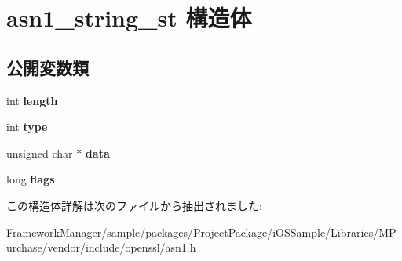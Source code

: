 \hypertarget{structasn1__string__st}{}\section{asn1\+\_\+string\+\_\+st 構造体}
\label{structasn1__string__st}
\subsection*{公開変数類}
\begin{DoxyCompactItemize}
\item 
\hypertarget{structasn1__string__st_a425b332bd4925320832bb18c59f6a9df}{}int {\bfseries length}\label{structasn1__string__st_a425b332bd4925320832bb18c59f6a9df}

\item 
\hypertarget{structasn1__string__st_a4bc5c5a5d5cd42ec6108e8bef50e09ad}{}int {\bfseries type}\label{structasn1__string__st_a4bc5c5a5d5cd42ec6108e8bef50e09ad}

\item 
\hypertarget{structasn1__string__st_a275a9784693f470debfb2b97411a4fea}{}unsigned char $\ast$ {\bfseries data}\label{structasn1__string__st_a275a9784693f470debfb2b97411a4fea}

\item 
\hypertarget{structasn1__string__st_a166fa78d828cb41bb2499ad411c1774c}{}long {\bfseries flags}\label{structasn1__string__st_a166fa78d828cb41bb2499ad411c1774c}

\end{DoxyCompactItemize}


この構造体詳解は次のファイルから抽出されました\+:\begin{DoxyCompactItemize}
\item 
Framework\+Manager/sample/packages/\+Project\+Package/i\+O\+S\+Sample/\+Libraries/\+M\+Purchase/vendor/include/openssl/asn1.\+h\end{DoxyCompactItemize}
